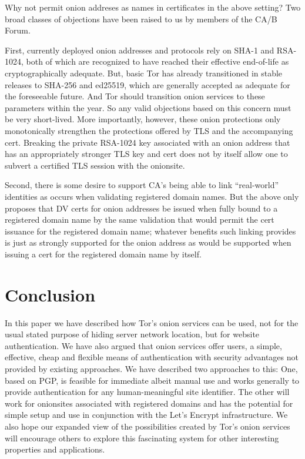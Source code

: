 \documentclass[10pt, conference, compsocconf]{styles/IEEEtran}
\begin{document}
Why not permit onion addreses as names in certificates in the above
setting? Two broad classes of objections have been raised to us by
members of the CA/B Forum.

First, currently deployed onion addresses and protocols rely on SHA-1
and RSA-1024, both of which are recognized to have reached their
effective end-of-life as cryptographically adequate. But, basic Tor
has already transitioned in stable releases to SHA-256 and ed25519,
which are generally accepted as adequate for the foreseeable future. And
Tor should transition onion services to these parameters within the
year. So any valid objections based on this concern must be very
short-lived.  More importantly, however, these onion protections only
monotonically strengthen the protections offered by TLS and the
accompanying cert. Breaking the private RSA-1024 key associated with
an onion address that has an appropriately stronger TLS key and cert
does not by itself allow one to subvert a certified TLS session with
the onionsite.

Second, there is some desire to support CA's being able to link
``real-world'' identities as occurs when validating registered
domain names. But the above only proposes that DV certs for onion addresses
be issued when fully bound to a registered domain name by
the same validation that would permit the cert issuance for the registered
domain name; whatever benefits such linking provides
is just as strongly supported for the onion address as would be supported
when  issuing a cert for the registered domain name by itself.

\section{Conclusion}

In this paper we have described how Tor's onion services can be used,
not for the usual stated purpose of hiding server network location,
but for website authentication.  We have also argued that onion
services offer users, a simple, effective, cheap and flexible means of
authentication with security advantages not provided by existing
approaches. We have described two approaches to this: One, based on
PGP, is feasible for immediate albeit manual use and works generally
to provide authentication for any human-meaningful site identifier. 
The other will work for onionsites associated with registered domains
and has the potential for simple setup and use in conjunction with the
Let's Encrypt infrastructure.  We also hope our expanded view of the
possibilities created by Tor's onion services will encourage others to
explore this fascinating system for other interesting properties and
applications.
\end{document}
